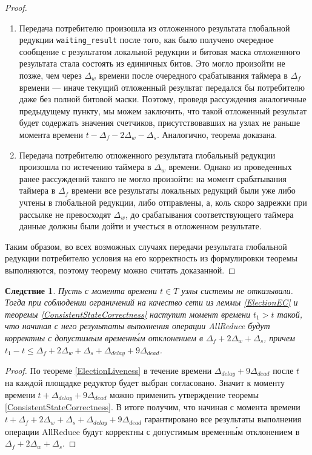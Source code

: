 \documentclass{article}
\theoremstyle{plain}
\theoremstyle{plain}
\newtheorem{consequence}[theorem]{Следствие}
\theoremstyle{plain}
\theoremstyle{plain}
\theoremstyle{definition}
\theoremstyle{remark}
\theoremstyle{plain}
\begin{document}
\begin{proof}
\begin{enumerate}
        \item Передача потребителю произошла из отложенного результата глобальной редукции \texttt{waiting\_result} после того, как было получено очередное сообщение с результатом локальной редукции и битовая маска отложенного результата стала состоять из единичных битов. Это могло произойти не позже, чем через $\Delta_w$ времени после очередного срабатывания таймера в $\Delta_f$ времени --- иначе текущий отложенный результат передался бы потребителю даже без полной битовой маски. Поэтому, проведя рассуждения аналогичные предыдущему пункту, мы можем заключить, что такой отложенный результат будет содержать значения счетчиков, присутствовавших на узлах не раньше момента времени $t - \Delta_f - 2\Delta_w - \Delta_s$. Аналогично, теорема доказана.
        
        \item Передача потребителю отложенного результата глобальный редукции произошла по истечению таймера в $\Delta_w$ времени. Однако из проведенных ранее рассуждений такого не могло произойти: на момент срабатывания таймера в $\Delta_f$ времени все результаты локальных редукций были уже либо учтены в глобальной редукции, либо отправлены, а, коль скоро задрежки при рассылке не превосходят $\Delta_w$, до срабатывания соответствующего таймера данные должны были дойти и учесться в отложенном результате.
    \end{enumerate}
    
    Таким образом, во всех возможных случаях передачи результата глобальной редукции потребителю условия на его корректность из формулировки теоремы выполняются, поэтому теорему можно считать доказанной.
\end{proof}

\begin{consequence}
    Пусть с момента времени $t \in T$ узлы системы не отказывали. Тогда при соблюдении ограничений на качество сети из леммы \ref{ElectionEC} и теоремы \ref{ConsistentStateCorrectness} наступит момент времени $t_1 > t$ такой, что начиная с него результаты выполнения операции AllReduce будут корректны с допустимым временн\'{ы}м отклонением в $\Delta_f + 2\Delta_w + \Delta_s$, причем $t_1 - t \leq \Delta_f + 2\Delta_w + \Delta_s + \Delta_{delay} + 9\Delta_{dead}$.
\end{consequence}
\begin{proof}
    По теореме \ref{ElectionLiveness} в течение времени $\Delta_{delay} + 9\Delta_{dead}$ после $t$ на каждой площадке редуктор будет выбран согласовано. Значит к моменту времени $t + \Delta_{delay} + 9\Delta_{dead}$ можно применить утверждение теоремы \ref{ConsistentStateCorrectness}. В итоге получим, что начиная с момента времени $t + \Delta_f + 2\Delta_w + \Delta_s + \Delta_{delay} + 9\Delta_{dead}$ гарантировано все результаты выполнения операции AllReduce будут корректны с допустимым временн\'{ы}м отклонением в $\Delta_f + 2\Delta_w + \Delta_s$.
\end{proof}
\end{document}
